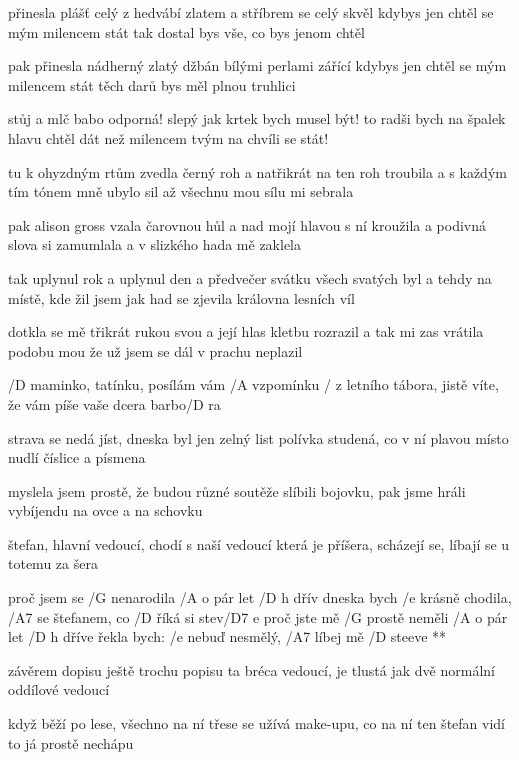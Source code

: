přinesla plášť celý z hedvábí
zlatem a stříbrem se celý skvěl
kdybys jen chtěl se mým milencem stát
tak dostal bys vše, co bys jenom chtěl \s

pak přinesla nádherný zlatý džbán
bílými perlami zářící
kdybys jen chtěl se mým milencem stát
těch darů bys měl plnou truhlici \songgg

stůj a mlč babo odporná!
slepý jak krtek bych musel být!
to radši bych na špalek hlavu chtěl dát
než milencem tvým na chvíli se stát! \s

\rr

tu k ohyzdným rtům zvedla černý roh
a natřikrát na ten roh troubila
a s každým tím tónem mně ubylo sil
až všechnu mou sílu mi sebrala \s

pak alison gross vzala čarovnou hůl
a nad mojí hlavou s ní kroužila
a podivná slova si zamumlala
a v slizkého hada mě zaklela

\rr

tak uplynul rok a uplynul den
a předvečer svátku všech svatých byl
a tehdy na místě, kde žil jsem jak had
se zjevila královna lesních víl \s

dotkla se mě třikrát rukou svou
a její hlas kletbu rozrazil
a tak mi zas vrátila podobu mou
že už jsem se dál v prachu neplazil

\rr




/D maminko, tatínku, posílám vám /A vzpomínku
/{ } z letního tábora, jistě víte, že vám píše
vaše dcera barbo/D ra \s

strava se nedá jíst, dneska byl jen zelný list
polívka studená, co v ní plavou místo nudlí
číslice a písmena \s

myslela jsem prostě, že budou různé soutěže
slíbili bojovku, pak jsme hráli vybíjendu
na ovce a na schovku \s

štefan, hlavní vedoucí, chodí s naší vedoucí
která je příšera, scházejí se, líbají se
u totemu za šera

\R  proč jsem se /G nenarodila /A o pár let /{D h} dřív
    dneska bych /e krásně chodila, /A7 se štefanem, co /D říká si stev/D7 e
    proč jste mě /G prostě neměli /A o pár let /{D h} dříve
    řekla bych: /e nebuď nesmělý, /A7 líbej mě /D steeve **

závěrem dopisu ještě trochu popisu
ta bréca vedoucí, je tlustá jak dvě normální
oddílové vedoucí \s

když běží po lese, všechno na ní třese se
užívá make-upu, co na ní ten štefan vidí
to já prostě nechápu

